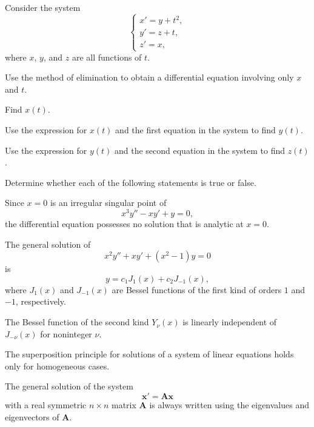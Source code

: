 \begin{problem}
Consider the system
\[
\begin{cases}
x'=y+t^2,\\
y'=z+t,\\
z'=x,
\end{cases}
\]
where $x$, $y$, and $z$ are all functions of $t$.
\begin{problemsubparts}
\item Use the method of elimination to obtain a differential equation involving only $x$ and $t$.
\item Find $x(t)$.
\item Use the expression for $x(t)$ and the first equation in the system to find $y(t)$.
\item Use the expression for $y(t)$ and the second equation in the system to find $z(t)$.
\end{problemsubparts}
\end{problem}

\begin{problem}
Determine whether each of the following statements is true or false.
\begin{problemchoices}
\item Since $x=0$ is an irregular singular point of
\[
x^3y''-xy'+y=0,
\]
the differential equation possesses no solution that is analytic at $x=0$.
\item The general solution of
\[
x^2y''+xy'+(x^2-1)y=0
\]
is
\[
y=c_1J_1(x)+c_2J_{-1}(x),
\]
where $J_1(x)$ and $J_{-1}(x)$ are Bessel functions of the first kind of orders $1$ and $-1$, respectively.
\item The Bessel function of the second kind $Y_\nu(x)$ is linearly independent of $J_{-\nu}(x)$ for noninteger $\nu$.
\item The superposition principle for solutions of a system of linear equations holds only for homogeneous cases.
\item The general solution of the system
\[
\mathbf x'=\mathbf A\mathbf x
\]
with a real symmetric $n\times n$ matrix $\mathbf A$ is always written using the eigenvalues and eigenvectors of $\mathbf A$.
\end{problemchoices}
\end{problem}

